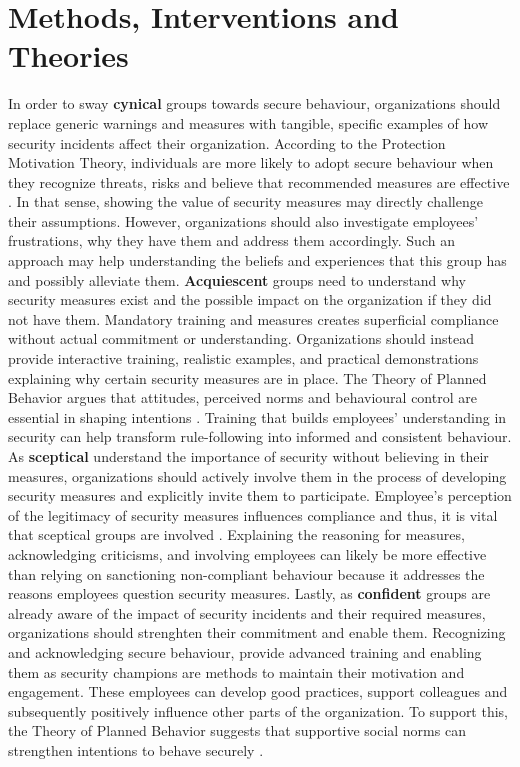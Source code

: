 \documentclass[12pt]{article}
\begin{document}
\section{Methods, Interventions and Theories}
In order to sway \textbf{cynical} groups towards secure behaviour, organizations should replace generic warnings and measures with tangible, specific examples of how security incidents affect their organization. According to the Protection Motivation Theory, individuals are more likely to adopt secure behaviour when they recognize threats, risks and believe that recommended measures are effective \cite{zis-Rogers1983Cognitive}. In that sense, showing the value of security measures may directly challenge their assumptions. However, organizations should also investigate employees’ frustrations, why they have them and address them accordingly. Such an approach may help understanding the beliefs and experiences that this group has and possibly alleviate them.
\newline
\textbf{Acquiescent} groups need to understand why security measures exist and the possible impact on the organization if they did not have them. Mandatory training and measures creates superficial compliance without actual commitment or understanding. Organizations should instead provide interactive training, realistic examples, and practical demonstrations explaining why certain security measures are in place. The Theory of Planned Behavior argues that  attitudes, perceived  norms and behavioural control are essential in shaping intentions \cite{ajzen1991theory}. Training that builds employees’ understanding in security can help transform rule-following into informed and consistent behaviour.
\newline
As \textbf{sceptical} understand the importance of security without believing in their measures, organizations should actively involve them in the process of developing security measures and explicitly invite them to participate. Employee's perception of the legitimacy of security measures influences compliance and thus, it is vital that sceptical groups are involved \cite{cram2023legitimacy}. Explaining the reasoning for measures, acknowledging criticisms, and involving employees can likely be more effective than relying on sanctioning non-compliant behaviour because it addresses the reasons employees question security measures.
\newline
Lastly, as \textbf{confident} groups are already aware of the impact of security incidents and their required measures, organizations should strenghten their commitment and enable them. Recognizing and acknowledging secure behaviour, provide advanced training and enabling them as security champions are methods to maintain their motivation and engagement. These employees can develop good practices, support colleagues and subsequently positively influence other parts of the organization. To support this, the Theory of Planned Behavior suggests that supportive social norms can strengthen intentions to behave securely \cite{ajzen1991theory}. 
\end{document}
